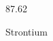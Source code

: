 \documentclass[12pt]{article}
\begin{document}
\hfill{}
\vfill
\begin{center}
  {\fontsize{50}{60}
  }

  \vspace{1em}

  87.62

Strontium
\end{center}
\vfill
\end{document}
